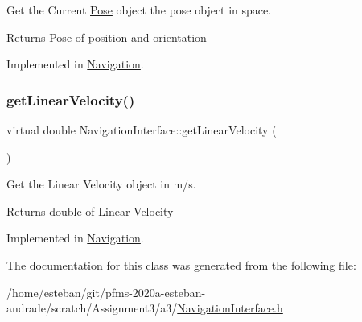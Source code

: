 Get the Current \hyperlink{structPose}{Pose} object the pose object in space. 

\begin{DoxyReturn}{Returns}
\hyperlink{structPose}{Pose} of position and orientation 
\end{DoxyReturn}


Implemented in \hyperlink{classNavigation_af82fc8cc1546fa2a54e8a8651c1adc80}{Navigation}.

\mbox{\label{classNavigationInterface_aa5c9df2654078875f72368e919e28432}} 
\subsubsection{\texorpdfstring{get\+Linear\+Velocity()}{getLinearVelocity()}}
{\footnotesize\ttfamily virtual double Navigation\+Interface\+::get\+Linear\+Velocity (\begin{DoxyParamCaption}{ }\end{DoxyParamCaption})\hspace{0.3cm}{\ttfamily [pure virtual]}}



Get the Linear Velocity object in m/s. 

\begin{DoxyReturn}{Returns}
double of Linear Velocity 
\end{DoxyReturn}


Implemented in \hyperlink{classNavigation_a9aef484e223556a207734159612fb2c9}{Navigation}.



The documentation for this class was generated from the following file\+:\begin{DoxyCompactItemize}
\item 
/home/esteban/git/pfms-\/2020a-\/esteban-\/andrade/scratch/\+Assignment3/a3/\hyperlink{NavigationInterface_8h}{Navigation\+Interface.\+h}\end{DoxyCompactItemize}
